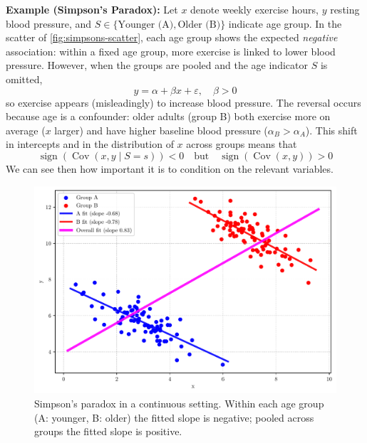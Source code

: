 \begin{exampleBox}
    \textbf{Example (Simpson's Paradox):}
    Let $x$ denote weekly exercise hours, $y$ resting blood pressure, and $S\in\{\text{Younger (A)},\text{Older (B)}\}$ indicate age group. In the scatter of \autoref{fig:simpsons-scatter}, each age group shows the expected \emph{negative} association: within a fixed age group, more exercise is linked to lower blood pressure. However, when the groups are pooled and the age indicator $S$ is omitted,
    \begin{equation}
        y = \alpha + \beta x + \varepsilon,\quad \beta>0
    \end{equation}
    so exercise appears (misleadingly) to increase blood pressure. The reversal occurs because age is a confounder: older adults (group B) both exercise more on average ($x$ larger) and have higher baseline blood pressure ($\alpha_B>\alpha_A$). This shift in intercepts and in the distribution of $x$ across groups means that
    \begin{equation}
        \operatorname{sign}\!\left(\operatorname{Cov}(x,y\mid S=s)\right)<0
        \quad\text{but}\quad
        \operatorname{sign}\!\left(\operatorname{Cov}(x,y)\right)>0
    \end{equation}
    We can see then how important it is to condition on the relevant variables.

    \begin{figure}[H]
      \centering
      \includegraphics[width=\linewidth]{figs/probability/simpsons_paradox_scatter.pdf}
      \caption{Simpson's paradox in a continuous setting. Within each age group (A: younger, B: older) the fitted slope is negative; pooled across groups the fitted slope is positive.}
      \label{fig:simpsons-scatter}
    \end{figure}
    
\end{exampleBox}
    
